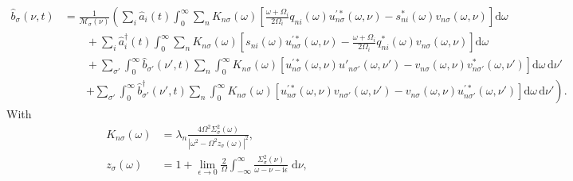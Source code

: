 \begin{equation}
\begin{split}
\hat{b}_\sigma(\nu,t) 
&= \frac{1}{\mathcal{M}_\sigma(\nu)}\left(\sum_i\hat{a}_i(t)\int_0^\infty\sum_n K_{n\sigma}(\omega)\left[\frac{\omega + \Omega_i}{2\Omega_i}q_{ni}(\omega)u_{n\sigma}^{\prime*}(\omega,\nu) - s_{ni}^*(\omega)v_{n\sigma}(\omega,\nu)\right]\mathrm{d}\omega\right.\\
&\qquad + \sum_i\hat{a}_i^\dagger(t)\int_0^\infty\sum_nK_{n\sigma}(\omega)\left[s_{ni}(\omega)u_{n\sigma}^{\prime*}(\omega,\nu) - \frac{\omega + \Omega_i}{2\Omega_i}q_{ni}^*(\omega)v_{n\sigma}(\omega,\nu)\right]\mathrm{d}\omega\\
&\qquad + \sum_{\sigma'}\int_0^\infty\hat{b}_{\sigma'}(\nu',t)\sum_n\int_0^\infty K_{n\sigma}(\omega)\left[u_{n\sigma}^{\prime*}(\omega,\nu)u'_{n\sigma'}(\omega,\nu') - v_{n\sigma}(\omega,\nu)v_{n\sigma'}^*(\omega,\nu')\right]\mathrm{d}\omega\,\mathrm{d}\nu'\\
&\qquad\left. + \sum_{\sigma'}\int_0^\infty\hat{b}_{\sigma'}^\dagger(\nu',t)\sum_n\int_0^\infty K_{n\sigma}(\omega)\left[u_{n\sigma}^{\prime*}(\omega,\nu)v_{n\sigma'}(\omega,\nu') - v_{n\sigma}(\omega,\nu)u_{n\sigma'}^{\prime*}(\omega,\nu')\right]\mathrm{d}\omega\,\mathrm{d}\nu'\right).
\end{split}
\end{equation}
With
\begin{equation}
\begin{split}
K_{n\sigma}(\omega) &= \lambda_n\frac{4\Omega^2\Sigma_\sigma^2(\omega)}{|\omega^2 - \Omega^2z_\sigma(\omega)|^2},\\
z_\sigma(\omega) &= 1 + \lim_{\epsilon\to0}\frac{2}{\Omega}\int_{-\infty}^\infty\frac{\Sigma_\sigma^2(\nu)}{\omega - \nu - \mathrm{i}\epsilon}\;\mathrm{d}\nu,
\end{split}
\end{equation}

